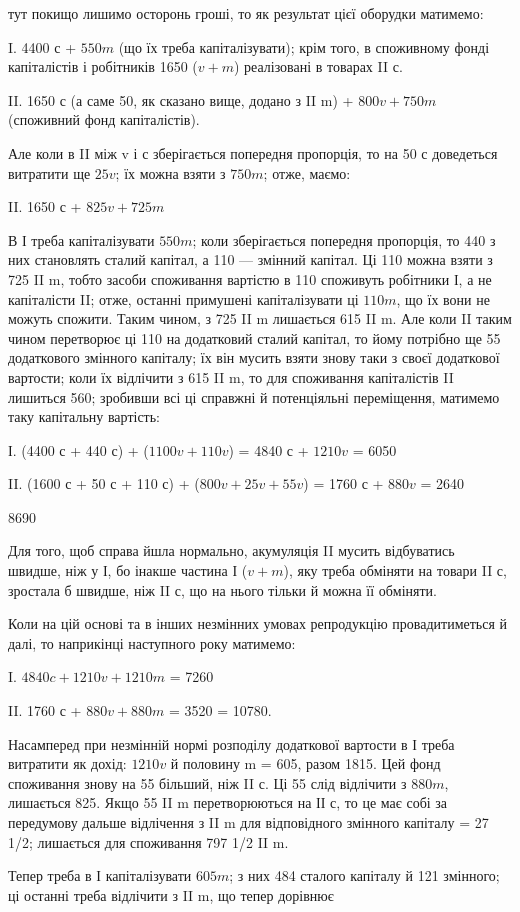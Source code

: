 \parcont{}  %
тут покищо лишимо осторонь гроші, то як результат цієї оборудки
матимемо:

I.    4400 с + $550 m$ (що їх треба капіталізувати); крім того, в споживному
фонді капіталістів і робітників 1650 ($v + m$) реалізовані в
товарах II с.

II.    1650 с (а саме 50, як сказано вище, додано з II m) + $800 v +
750 m$ (споживний фонд капіталістів).

Але коли в II між v і с зберігається попередня пропорція, то на 50 с
доведеться витратити ще $25 v$; їх можна взяти з $750 m$; отже, маємо:

II. 1650 с + $825 v + 725 m$

В І треба капіталізувати $550 m$; коли зберігається попередня пропорція,
то 440 з них становлять сталий капітал, а 110 — змінний капітал.
Ці 110 можна взяти з 725 II m, тобто засоби споживання вартістю в
110 споживуть робітники І, а не капіталісти II; отже, останні примушені
капіталізувати ці $110 m$, що їх вони не можуть спожити. Таким чином,
з 725 II m лишається 615 II m. Але коли II таким чином перетворює
ці 110 на додатковий сталий капітал, то йому потрібно ще 55 додаткового
змінного капіталу; їх він мусить взяти знову таки з своєї додаткової
вартости; коли їх відлічити з 615 II m, то для споживання капіталістів II
лишиться 560; зробивши всі ці справжні й потенціяльні переміщення,
матимемо таку капітальну вартість:

І. (4400 с + 440 с) + ($1100v + 110 v$) = 4840 с + $1210 v$ = 6050

II. (1600 с + 50 с + 110 с) + ($800 v + 25 v + 55 v$) = 1760 с + $880 v$ = 2640

8690

Для того, щоб справа йшла нормально, акумуляція II мусить відбуватись
швидше, ніж у І, бо інакше частина І ($v + m$), яку треба обміняти
на товари II с, зростала б швидше, ніж II с, що на нього тільки й можна
її обміняти.

Коли на цій основі та в інших незмінних умовах репродукцію провадитиметься
й далі, то наприкінці наступного року матимемо:

I.    $4840 c + 1210 v + 1210 m$ = 7260

II.    1760 с + $880 v + 880 m$ = 3520
= 10780.

Насамперед при незмінній нормі розподілу додаткової вартости в І
треба витратити як дохід: $1210 v$ й половину m = 605, разом 1815.
Цей фонд споживання знову на 55 більший, ніж II с. Ці 55 слід відлічити
з $880 m$, лишається 825. Якщо 55 II m перетворюються на ІІ с, то це
має собі за передумову дальше відлічення з II m для відповідного змінного
капіталу = 27 1/2; лишається для споживання 797 1/2 II m.

Тепер треба в І капіталізувати $605 m$; з них 484 сталого капіталу й
121 змінного; ці останні треба відлічити з II m, що тепер дорівнює
\parbreak{}  %
